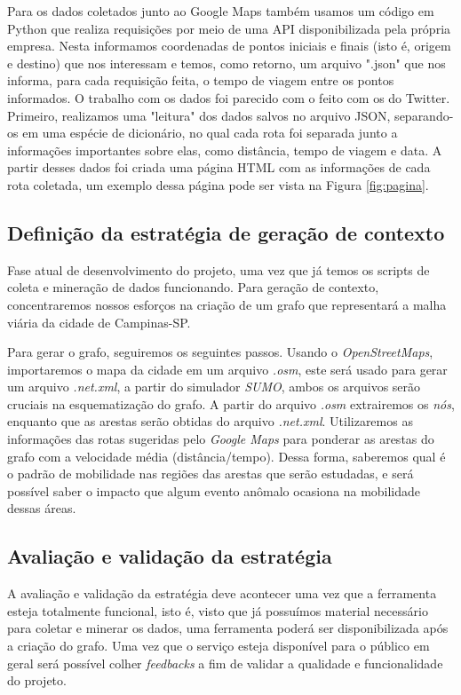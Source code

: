 Para os dados coletados junto ao Google Maps também usamos um código em Python que realiza requisições por meio de uma API disponibilizada pela própria empresa. Nesta informamos coordenadas de pontos iniciais e finais (isto é, origem e destino) que nos interessam e temos, como retorno, um arquivo ".json" que nos informa, para cada requisição feita, o tempo de viagem entre os pontos informados. O trabalho com os dados foi parecido com o feito com os do Twitter. Primeiro, realizamos uma "leitura" dos dados salvos no arquivo JSON, separando-os em uma espécie de dicionário, no qual cada rota foi separada junto a informações importantes sobre elas, como distância, tempo de viagem e data. A partir desses dados foi criada uma página HTML com as informações de cada rota coletada, um exemplo dessa página pode ser vista na Figura \ref{fig:pagina}.

\subsection{Definição da estratégia de geração de contexto}
Fase atual de desenvolvimento do projeto, uma vez que já temos os scripts de coleta e mineração de dados funcionando. Para geração de contexto, concentraremos nossos esforços na criação de um grafo que representará a malha viária da cidade de Campinas-SP.

Para gerar o grafo, seguiremos os seguintes passos. Usando o \emph{OpenStreetMaps}, importaremos o mapa da cidade em um arquivo \emph{.osm}, este será usado para gerar um arquivo \emph{.net.xml}, a partir do simulador \emph{SUMO}, ambos os arquivos serão cruciais na esquematização do grafo. A partir do arquivo \emph{.osm} extrairemos os \emph{nós}, enquanto que as arestas serão obtidas do arquivo \emph{.net.xml}. Utilizaremos as informações das rotas sugeridas pelo \emph{Google Maps} para ponderar as arestas do grafo com a velocidade média (distância/tempo). Dessa forma, saberemos qual é o padrão de mobilidade nas regiões das arestas que serão estudadas, e será possível saber o impacto que algum evento anômalo ocasiona na mobilidade dessas áreas.

\subsection{Avaliação e validação da estratégia}
A avaliação e validação da estratégia deve acontecer uma vez que a ferramenta esteja totalmente funcional, isto é, visto que já possuímos material necessário para coletar e minerar os dados, uma ferramenta poderá ser disponibilizada após a criação do grafo. Uma vez que o serviço esteja disponível para o público em geral será possível colher \emph{feedbacks} a fim de validar a qualidade e funcionalidade do projeto.

